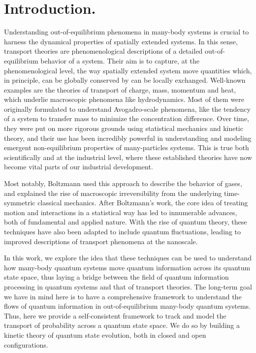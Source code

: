 \documentclass[draft,nofootinbib,pre,twocolumn,showpacs,showkeys,preprintnumbers,floatfix]{revtex4-1}
\newcommand{\1}{\mathbbm{1}}
\begin{document}

\date{\today}
\maketitle





\section*{Introduction.} Understanding out-of-equilibrium phenomena in many-body systems 
is crucial to harness the dynamical properties of spatially extended systems. In this sense, transport 
theories are phenomenological descriptions of a detailed out-of-equilibrium behavior of a system. Their 
aim is to capture, at the phenomenological level, the way spatially extended system move quantities
which, in principle, can be globally conserved by can be locally exchanged. Well-known examples are the 
theories of transport of charge, mass, momentum and heat, which underlie macroscopic phenomena like hydrodynamics. 
Most of them were originally formulated to understand Avogadro-scale phenomena, like the tendency of a 
system to transfer mass to minimize the concentration difference. Over time, they were put on more rigorous 
grounds using statistical mechanics and kinetic theory, and their use has been incredibly powerful in understanding 
and modeling emergent non-equilibrium properties of many-particles systems. This is true both scientifically and 
at the industrial level, where these established theories have now become vital parts of our industrial 
development.
 
Most notably, Boltzmann used this approach to describe the behavior of gases, and explained the rise of 
macroscopic irreversibility from the underlying time-symmetric classical mechanics. After 
Boltzmann's work, the core idea of treating motion and interactions in a statistical way has 
led to innumerable advances, both of fundamental and applied nature. With the rise of 
quantum theory, these techniques have also been adapted to include quantum fluctuations, 
leading to improved descriptions of transport phenomena at the nanoscale.
 
In this work, we explore the idea that these techniques can be used to understand how many-body 
quantum systems move quantum information across its quantum state space, thus laying a bridge 
between the field of quantum information processing in quantum systems and that of transport theories. 
The long-term goal we have in mind here is to have a comprehensive framework to understand the flows
of quantum information in out-of-equilibrium many-body quantum systems. Thus, here we provide a self-consistent 
framework to track and model the transport of probability across a quantum state space. We do so by building 
a kinetic theory of quantum state evolution, both in closed and open configurations.
\end{document}
